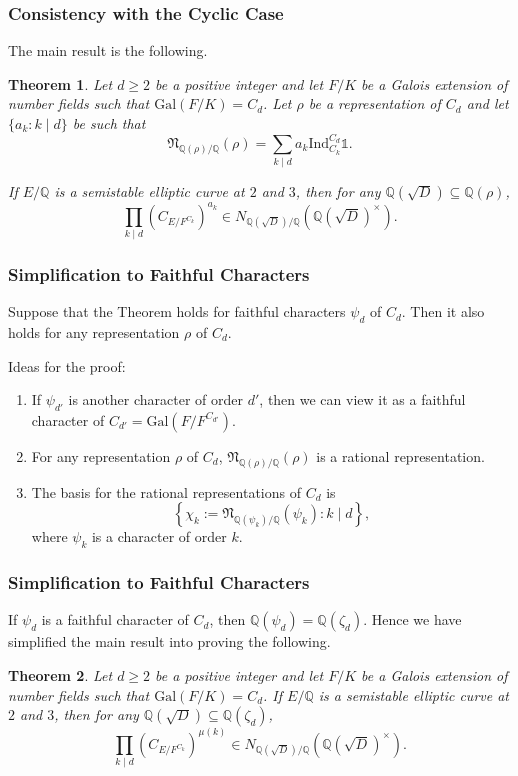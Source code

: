 \documentclass{beamer}
\newcommand{\Gal}{\mathrm{Gal}}
\newcommand{\Ind}{\mathrm{Ind}}
\newcommand{\QQ}{\mathbb{Q}}
\newcommand{\bQ}{\mathbb{Q}}
\newcommand{\fN}{\mathfrak{N}}
\newcommand{\repnorm}[1]{\fN_{\bQ(#1) / \bQ}(#1)}
\theoremstyle{plain}
\newtheorem{thm}{Theorem}[section]
\begin{document}
\begin{frame}
    \frametitle{Consistency with the Cyclic Case}
    The main result is the following.
    \begin{thm}
        Let $d\geq2$ be a positive integer and let $F/K$ be a Galois extension of number fields such that $\Gal(F/K)=C_d$. Let $\rho$ be a representation of $C_d$ and let $\{a_k:k\mid d\}$ be such that $$\repnorm{\rho}=\sum_{k\mid d}a_k\Ind_{C_k}^{C_d}\mathds{1}.$$
    
        If $E/\QQ$ is a semistable elliptic curve at $2$ and $3$, then for any $\QQ(\sqrt{D})\subseteq\QQ(\rho)$,
        $$\prod_{k\mid d}(C_{E/F^{C_k}})^{a_k}\in N_{\QQ(\sqrt{D})/\QQ}(\QQ(\sqrt{D})^{\times}).$$
    \end{thm}

\end{frame}


\begin{frame}
    \frametitle{Simplification to Faithful Characters}

    \begin{lemma}
        Suppose that the Theorem holds for faithful characters $\psi_d$ of $C_d$. Then it also holds for any representation $\rho$ of $C_d$.
    \end{lemma}

    Ideas for the proof:
    \begin{enumerate}
        \item If $\psi_{d'}$ is another character of order $d'$, then we can view it as a faithful character of $C_{d'}=\Gal(F/F^{C_{d'}})$.
        \item For any representation $\rho$ of $C_d$, $\repnorm{\rho}$ is a rational representation.
        \item The basis for the rational representations of $C_d$ is 
        $$\left\{\chi_k:=\repnorm{\psi_k}:k\mid d\right\},$$
        where $\psi_k$ is a character of order $k$.
    \end{enumerate}

\end{frame}

\begin{frame}
    \frametitle{Simplification to Faithful Characters}
    If $\psi_d$ is a faithful character of $C_d$, then $\QQ(\psi_d)=\QQ(\zeta_d)$. Hence we have simplified the main result into proving the following.
    \begin{thm}
        Let $d\geq2$ be a positive integer and let $F/K$ be a Galois extension of number fields such that $\Gal(F/K)=C_d$. If $E/\QQ$ is a semistable elliptic curve at $2$ and $3$, then for any $\QQ(\sqrt{D})\subseteq\QQ(\zeta_d)$,
        $$\prod_{k\mid d}(C_{E/F^{C_k}})^{\mu(k)}\in N_{\QQ(\sqrt{D})/\QQ}(\QQ(\sqrt{D})^{\times}).$$
    \end{thm}
\end{frame}
\end{document}
